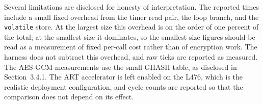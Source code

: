 Several limitations are disclosed for honesty of interpretation.
The reported times include a small fixed overhead from the timer read pair, the
loop branch, and the \texttt{volatile} store.
At the largest size this overhead is on the order of one percent of the total;
at the smallest size it dominates, so the smallest-size figures should be read
as a measurement of fixed per-call cost rather than of encryption work.
The harness does not subtract this overhead, and raw ticks are reported as
measured.
The AES-GCM measurements use the small GHASH table, as disclosed in
Section~3.4.1.
The ART accelerator is left enabled on the L476, which is the realistic
deployment configuration, and cycle counts are reported so that the comparison
does not depend on its effect.
